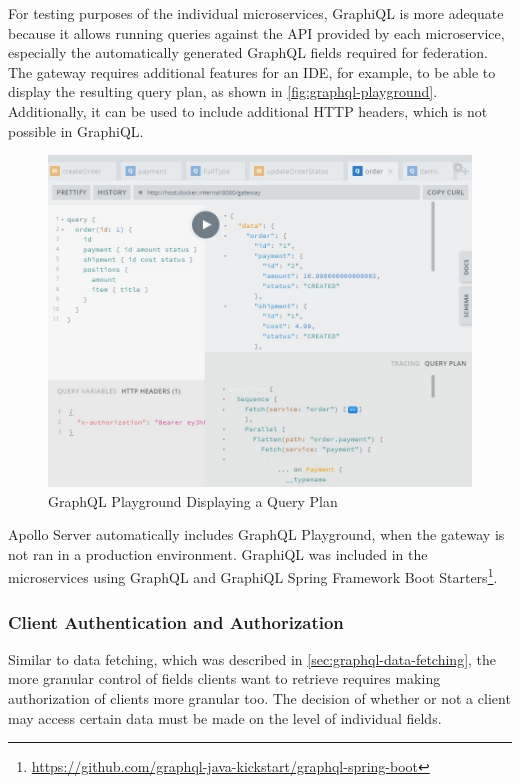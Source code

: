 For testing purposes of the individual microservices, GraphiQL is more adequate because it allows running queries against the \ac{API} provided by each microservice, especially the automatically generated GraphQL fields required for federation.
The gateway requires additional features for an \ac{IDE}, for example, to be able to display the resulting query plan, as shown in \autoref{fig:graphql-playground}.
Additionally, it can be used to include additional \ac{HTTP} headers, which is not possible in GraphiQL.%

\begin{figure}[h!]
    \centering
    \includegraphics[width=\textwidth]{images/graphql-playground.png}
    \caption{GraphQL Playground Displaying a Query Plan}\label{fig:graphql-playground}
\end{figure}

Apollo Server automatically includes GraphQL Playground, when the gateway is not ran in a production environment.
GraphiQL was included in the microservices using GraphQL and GraphiQL Spring Framework Boot Starters\footnote{\url{https://github.com/graphql-java-kickstart/graphql-spring-boot}}.

\subsubsection{Client Authentication and Authorization}\label{sec:graphql-auth}

Similar to data fetching, which was described in \autoref{sec:graphql-data-fetching}, the more granular control of fields clients want to retrieve requires making authorization of clients more granular too.
The decision of whether or not a client may access certain data must be made on the level of individual fields.

